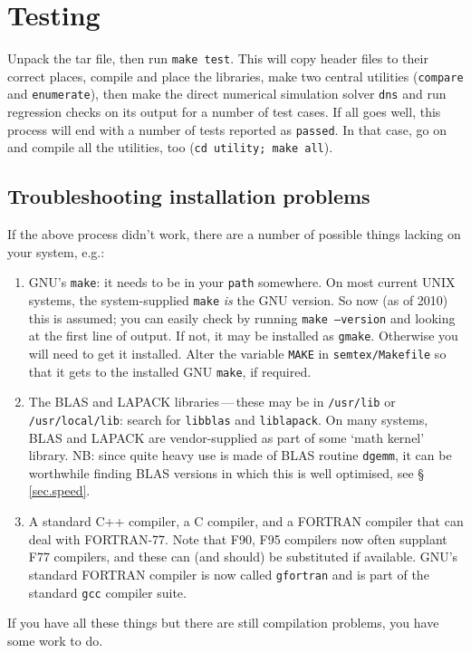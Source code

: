 \documentclass[11pt,a4paper]{report}
\begin{document}
\section{Testing}

Unpack the tar file, then run \texttt{make test}. This will copy
header files to their correct places, compile and place the libraries,
make two central utilities (\texttt{compare} and \texttt{enumerate}),
then make the direct numerical simulation solver \texttt{dns} and run
regression checks on its output for a number of test cases. If all
goes well, this process will end with a number of tests reported as
\texttt{passed}. In that case, go on and compile all the utilities,
too (\texttt{cd utility; make all}).

\subsection{Troubleshooting installation problems}
If the above process didn't work, there are a number of possible
things lacking on your system, e.g.:
\begin{enumerate}
\item GNU's \texttt{make}: it needs to be in your \texttt{path}
  somewhere.  On most current UNIX systems, the system-supplied
  \texttt{make} \emph{is} the GNU version. So now (as of 2010) this is
  assumed; you can easily check by running \texttt{make --version} and
  looking at the first line of output.  If not, it may be installed as
  \texttt{gmake}. Otherwise you will need to get it installed. Alter
  the variable \texttt{MAKE} in \texttt{semtex/Makefile} so that it
  gets to the installed GNU \texttt{make}, if required.
\item The BLAS and LAPACK libraries\,---\,these may be in
  \texttt{/usr/lib} or \texttt{/usr/local/lib}: search for
  \texttt{libblas} and \texttt{liblapack}.  On many systems, BLAS and
  LAPACK are vendor-supplied as part of some `math kernel' library.
  NB: since quite heavy use is made of BLAS routine \texttt{dgemm}, it
  can be worthwhile finding BLAS versions in which this is well
  optimised, see \S\,\ref{sec.speed}.
\item A standard C++ compiler, a C compiler, and a FORTRAN compiler
  that can deal with FORTRAN-77.  Note that F90, F95 compilers now
  often supplant F77 compilers, and these can (and should) be
  substituted if available. GNU's standard FORTRAN compiler is now
  called \texttt{gfortran} and is part of the standard \texttt{gcc}
  compiler suite.
\end{enumerate}
If you have all these things but there are still compilation problems,
you have some work to do.
\end{document}
